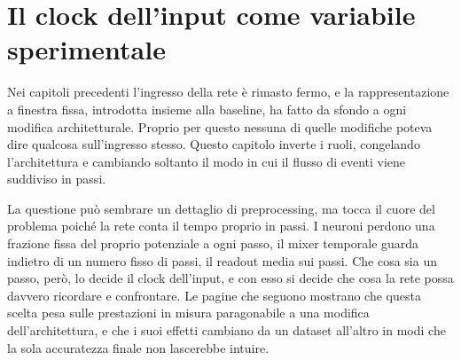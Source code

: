 \chapter{Il clock dell'input come variabile sperimentale}
\label{chap:clock_input}


Nei capitoli precedenti l'ingresso della rete è rimasto fermo, e la rappresentazione a finestra fissa, introdotta insieme alla baseline, ha fatto da sfondo a ogni modifica architetturale. Proprio per questo nessuna di quelle modifiche poteva dire qualcosa sull'ingresso stesso. Questo capitolo inverte i ruoli, congelando l'architettura e cambiando soltanto il modo in cui il flusso di eventi viene suddiviso in passi.

La questione può sembrare un dettaglio di preprocessing, ma tocca il cuore del problema poiché la rete conta il tempo proprio in passi. I neuroni perdono una frazione fissa del proprio potenziale a ogni passo, il mixer temporale guarda indietro di un numero fisso di passi, il readout media sui passi. Che cosa sia un passo, però, lo decide il clock dell'input, e con esso si decide che cosa la rete possa davvero ricordare e confrontare. Le pagine che seguono mostrano che questa scelta pesa sulle prestazioni in misura paragonabile a una modifica dell'architettura, e che i suoi effetti cambiano da un dataset all'altro in modi che la sola accuratezza finale non lascerebbe intuire.

